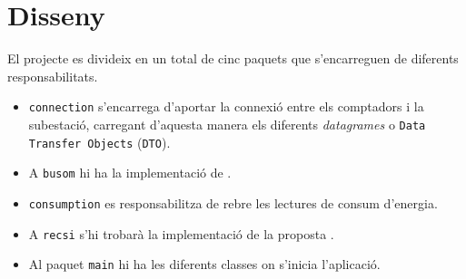 \section{Disseny}
El projecte es divideix en un total de cinc paquets que s'encarreguen de diferents responsabilitats.
\begin{itemize}
	\item \texttt{connection} s'encarrega d'aportar la connexió entre els comptadors i la subestació, carregant d'aquesta manera els diferents \textit{datagrames} o  \texttt{Data Transfer Objects} (\texttt{DTO}).
	\item A \texttt{busom} hi ha la implementació de \cite{busom}.
	\item \texttt{consumption} es responsabilitza de rebre les lectures de consum d'energia.
	\item A \texttt{recsi} s'hi trobarà la implementació de la proposta \cite{recsi}.
	\item Al paquet \texttt{main} hi ha les diferents classes on s'inicia l'aplicació. \label{list:packages}
\end{itemize}
